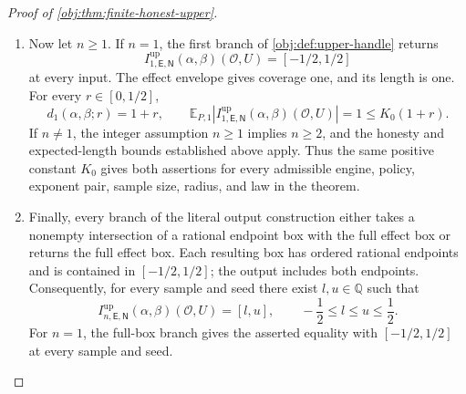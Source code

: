 \documentclass[11pt]{article}
\begin{document}
\begin{proof}[Proof of \cref{obj:thm:finite-honest-upper}]
\begin{enumerate}
\item Now let \(n\ge1\). If \(n=1\), the first branch of
\cref{obj:def:upper-handle} returns
\[
I^{\mathrm{up}}_{1,\mathsf E,\mathsf N}(\alpha,\beta)(\mathcal O,U)
=[-1/2,1/2]
\]
at every input. The effect envelope gives coverage one, and its length is one. For every \(r\in[0,1/2]\),
\[
d_1(\alpha,\beta;r)=1+r,
\qquad
\mathbb E_{P,1}
\left|
I^{\mathrm{up}}_{1,\mathsf E,\mathsf N}(\alpha,\beta)(\mathcal O,U)
\right|
=1
\le K_0(1+r).
\]
If \(n\ne1\), the integer assumption \(n\ge1\) implies \(n\ge2\), and the honesty and expected-length bounds established above apply. Thus the same positive constant \(K_0\) gives both assertions for every admissible engine, policy, exponent pair, sample size, radius, and law in the theorem.

\item Finally, every branch of the literal output construction either takes a nonempty intersection of a rational endpoint box with the full effect box or returns the full effect box. Each resulting box has ordered rational endpoints and is contained in \([-1/2,1/2]\); the output includes both endpoints. Consequently, for every sample and seed there exist \(l,u\in\mathbb Q\) such that
\[
I^{\mathrm{up}}_{n,\mathsf E,\mathsf N}(\alpha,\beta)(\mathcal O,U)
=[l,u],
\qquad
-\frac12\le l\le u\le\frac12.
\]
For \(n=1\), the full-box branch gives the asserted equality with
\([-1/2,1/2]\) at every sample and seed.
\end{enumerate}
\end{proof}
\end{document}
